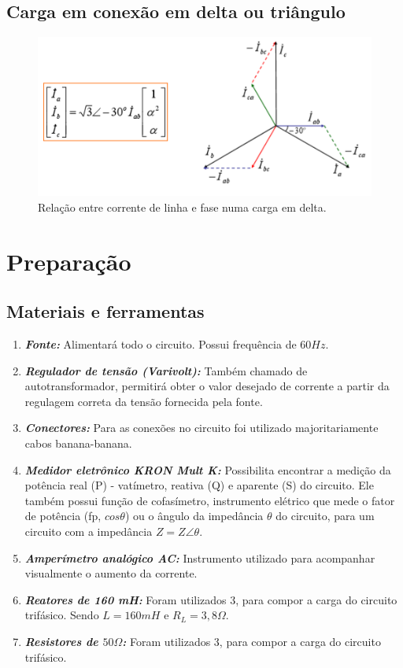 \documentclass[a4paper,12pt,oneside,openany,table,xcdraw]{article}
\begin{document}
\subsection{Carga em conexão em delta ou triângulo} \label{delta}
\begin{figure}[H]
\centering
\captionsetup{font=scriptsize}
\includegraphics[width=14.5cm]{carga-delta}
\caption{Relação entre corrente de linha e fase numa carga em delta.}
\label{carga-delta}
\end{figure}

\section{Preparação}
\subsection{Materiais e ferramentas} %
\begin{enumerate}[1 -]
\item \emph{\textbf{Fonte:}}
Alimentará todo o circuito. Possui frequência de $60Hz$.

\item \emph{\textbf{Regulador de tensão (Varivolt):}}
Também chamado de autotransformador, permitirá obter o valor desejado de corrente a partir da regulagem correta da tensão fornecida pela fonte.

\item \emph{\textbf{Conectores:}}
Para as conexões no circuito foi utilizado majoritariamente cabos banana-banana.

\item \emph{\textbf{Medidor eletrônico KRON Mult K:}}
Possibilita encontrar a medição da potência real (P) - vatímetro, reativa (Q) e aparente (S) do circuito. Ele também possui função de cofasímetro, instrumento elétrico que mede o fator de potência (fp, $cos\theta$) ou o ângulo da impedância $\theta$ do circuito, para um circuito com a impedância $Z = Z\angle \theta$.

\item \emph{\textbf{Amperímetro analógico AC:}}
Instrumento utilizado para acompanhar visualmente o aumento da corrente.

\item \emph{\textbf{Reatores de 160 mH:}}
Foram utilizados 3, para compor a carga do circuito trifásico. Sendo $L=160mH$ e $R_L=3,8\Omega$.

\item \emph{\textbf{Resistores de $50\Omega$:}}
Foram utilizados 3, para compor a carga do circuito trifásico.
\end{enumerate}
\end{document}
